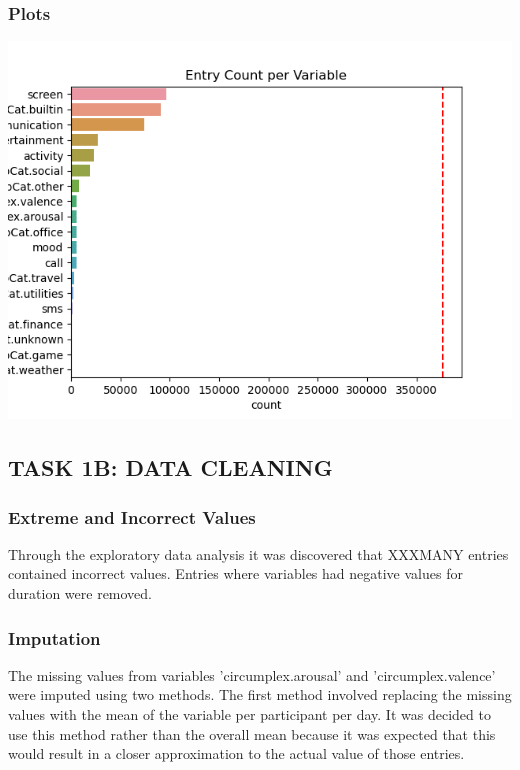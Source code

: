 \documentclass[runningheads]{llncs}
\begin{document}

\subsubsection{Plots}

\includegraphics{plots/variable_count.png}


\subsection{TASK 1B: DATA CLEANING}

\subsubsection{Extreme and Incorrect Values}
Through the exploratory data analysis it was discovered that XXXMANY entries contained incorrect values. Entries where variables had negative values for duration were removed.


\subsubsection{Imputation}
The missing values from variables 'circumplex.arousal' and 'circumplex.valence' were imputed using two methods. The first method involved replacing the missing values with the mean of the variable per participant per day. It was decided to use this method rather than the overall mean because it was expected that this would result in a closer approximation to the actual value of those entries.
\end{document}
